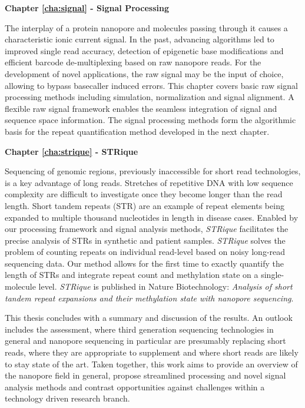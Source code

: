\textbf{Chapter \ref{cha:signal} - Signal Processing}

The interplay of a protein nanopore and molecules passing through it causes a characteristic ionic current signal.
In the past, advancing algorithms led to improved single read accuracy, detection of epigenetic base modifications and efficient barcode de-multiplexing based on raw nanopore reads.
For the development of novel applications, the raw signal may be the input of choice, allowing to bypass basecaller induced errors.
This chapter covers basic raw signal processing methods including simulation, normalization and signal alignment.
A flexible raw signal framework enables the seamless integration of signal and sequence space information.
The signal processing methods form the algorithmic basis for the repeat quantification method developed in the next chapter.


\textbf{Chapter \ref{cha:strique} - STRique}

Sequencing of genomic regions, previously inaccessible for short read technologies, is a key advantage of long reads.
Stretches of repetitive DNA with low sequence complexity are difficult to investigate once they become longer than the read length.
Short tandem repeats (STR) are an example of repeat elements being expanded to multiple thousand nucleotides in length in disease cases.
Enabled by our processing framework and signal analysis methods, \textit{STRique} facilitates the precise analysis of STRs in synthetic and patient samples.
\textit{STRique} solves the problem of counting repeats on individual read-level based on noisy long-read sequencing data.
Our method allows for the first time to exactly quantify the length of STRs and integrate repeat count and methylation state on a single-molecule level.
\textit{STRique} is published in Nature Biotechnology: \textit{Analysis of short tandem repeat expansions and their methylation state with nanopore sequencing}.


This thesis concludes with a summary and discussion of the results.
An outlook includes the assessment, where third generation sequencing technologies in general and nanopore sequencing in particular are presumably replacing short reads, where they are appropriate to supplement and where short reads are likely to stay state of the art.
Taken together, this work aims to provide an overview of the nanopore field in general, propose streamlined processing and novel signal analysis methods and contrast opportunities against challenges within a technology driven research branch.







